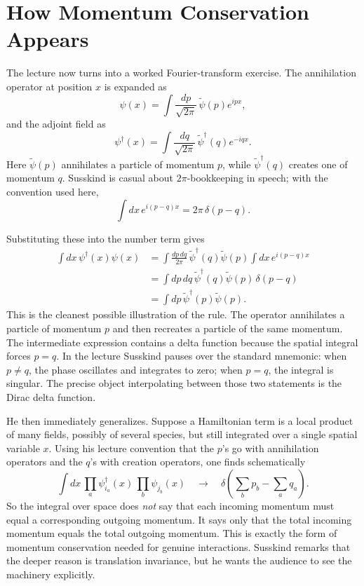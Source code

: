 \section{How Momentum Conservation Appears}

The lecture now turns into a worked Fourier-transform exercise. The annihilation operator at position \(x\) is expanded as
\begin{equation}
\psi(x)=\int \frac{dp}{\sqrt{2\pi}}\,\tilde\psi(p)e^{ipx},
\end{equation}
and the adjoint field as
\begin{equation}
\psi^\dagger(x)=\int \frac{dq}{\sqrt{2\pi}}\,\tilde\psi^\dagger(q)e^{-iqx}.
\end{equation}
Here \(\tilde\psi(p)\) annihilates a particle of momentum \(p\), while \(\tilde\psi^\dagger(q)\) creates one of momentum \(q\). Susskind is casual about \(2\pi\)-bookkeeping in speech; with the convention used here,
\begin{equation}
\int dx\,e^{i(p-q)x}=2\pi\,\delta(p-q).
\end{equation}

Substituting these into the number term gives
\begin{align}
\int dx\,\psi^\dagger(x)\psi(x)
&=
\int \frac{dp\,dq}{2\pi}\,\tilde\psi^\dagger(q)\tilde\psi(p)\int dx\,e^{i(p-q)x}
\\
&=
\int dp\,dq\,\tilde\psi^\dagger(q)\tilde\psi(p)\,\delta(p-q)
\\
&=
\int dp\,\tilde\psi^\dagger(p)\tilde\psi(p).
\end{align}
This is the cleanest possible illustration of the rule. The operator annihilates a particle of momentum \(p\) and then recreates a particle of the same momentum. The intermediate expression contains a delta function because the spatial integral forces \(p=q\). In the lecture Susskind pauses over the standard mnemonic: when \(p\neq q\), the phase oscillates and integrates to zero; when \(p=q\), the integral is singular. The precise object interpolating between those two statements is the Dirac delta function.

He then immediately generalizes. Suppose a Hamiltonian term is a local product of many fields, possibly of several species, but still integrated over a single spatial variable \(x\). Using his lecture convention that the \(p\)'s go with annihilation operators and the \(q\)'s with creation operators, one finds schematically
\begin{equation}
\int dx\,
\prod_{a}\psi^\dagger_{i_a}(x)\,
\prod_{b}\psi_{j_b}(x)
\quad \longrightarrow \quad
\delta\!\left(\sum_b p_b-\sum_a q_a\right).
\end{equation}
So the integral over space does \emph{not} say that each incoming momentum must equal a corresponding outgoing momentum. It says only that the total incoming momentum equals the total outgoing momentum. This is exactly the form of momentum conservation needed for genuine interactions. Susskind remarks that the deeper reason is translation invariance, but he wants the audience to see the machinery explicitly.

